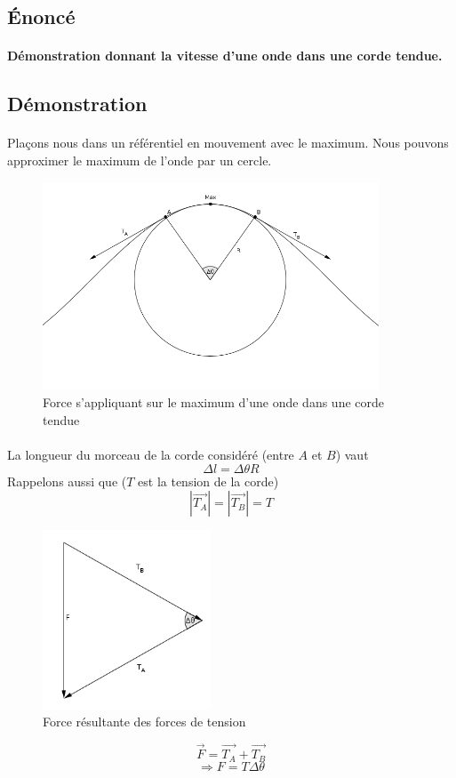 \documentclass[a4paper]{article}
\begin{document}
\subsection{Énoncé}
\paragraph{}\textbf{Démonstration donnant la vitesse d'une onde dans une corde tendue.}
\subsection{Démonstration}
\paragraph{}Plaçons nous dans un référentiel en mouvement avec le maximum. Nous pouvons approximer le maximum de l'onde par un cercle. 
\begin{figure}
\begin{center}
\includegraphics[width=10cm]{imgs/tension.png}
\end{center}
\caption{Force s'appliquant sur le maximum d'une onde dans une corde tendue}
\label{Force s'appliquant sur le maximum d'une onde dans une corde tendue}
\end{figure}
\paragraph{}La longueur du morceau de la corde considéré (entre $A$ et $B$) vaut
\[\Delta l=\Delta \theta R\]
Rappelons aussi que ($T$ est la tension de la corde)
\[\left|\vec{T_A}\right|=\left|\vec{T_B}\right|=T\]
\begin{figure}
\begin{center}
\includegraphics[width=5cm]{imgs/result.png}
\end{center}
\caption{Force résultante des forces de tension}
\label{Force résultante des forces de tension}
\end{figure}
\[\vec{F}=\vec{T_A}+\vec{T_B}\]
\[\Rightarrow F=T\Delta\theta\]
\end{document}
